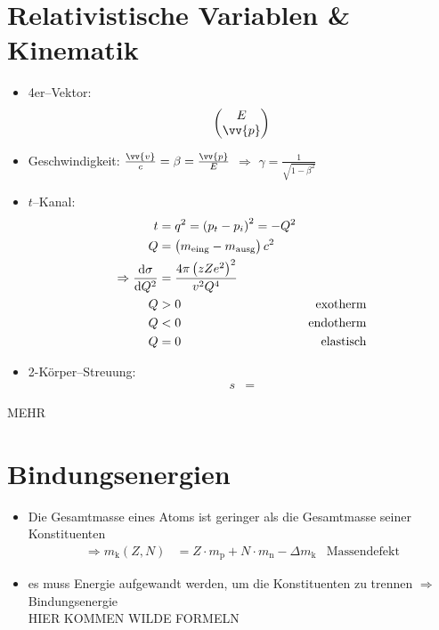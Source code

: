 \documentclass[BCOR=5mm,DIV=calc,listof=totoc,headings=big]{scrartcl}
\newcommand{\abl}[2]{\frac{\mathrm{d} #1}{\mathrm{d} #2}}
\begin{document}
\section{Relativistische Variablen \& Kinematik}
\label{sec:relat-vari-}
\begin{itemize}
\item 4er--Vektor:
  \begin{align*}
    \begin{pmatrix}
      E \\ \vv{p}
    \end{pmatrix}
  \end{align*}
\item Geschwindigkeit: $\frac{\vv{v}}{c}=\beta=\frac{\vv{p}}{E}$
  $\Rightarrow$ $\gamma=\frac{1}{\sqrt{1-\beta^{2}}}$
\item $t$--Kanal:
  \begin{align*}
    t&=q^{2}=\del{p_{t}-p_{i}}^{2}=-Q^{2}\\
    Q&=\del{m_{\text{eing}}-m_{\text{ausg}}}c^{2}\\
    \Rightarrow \abl{\sigma}{Q^{2}}&=\frac{4\pi
      \del{zZe^{2}}^{2}}{v^{2}Q^{4}}\\
    Q&>0 & \text{exotherm}\\
    Q&<0 & \text{endotherm}\\
    Q&=0 & \text{elastisch}
  \end{align*}
\item 2-Körper--Streuung:
  \begin{align*}
    s&=
  \end{align*}
\end{itemize}
MEHR

\section{Bindungsenergien}
\label{sec:bindungsenergien}
\begin{itemize}
\item Die Gesamtmasse eines Atoms ist geringer als die Gesamtmasse
  seiner Konstituenten
  \begin{align*}
    \Rightarrow m_{\mathrm{k}}(Z,N)&=Z \cdot m_{\mathrm{p}} + N \cdot
    m_{\mathrm{n}} - \Delta m_{\mathrm{k}} & \text{Massendefekt}
  \end{align*}
\item es muss Energie aufgewandt werden, um die Konstituenten zu
  trennen $\Rightarrow$ Bindungsenergie\\
HIER KOMMEN WILDE FORMELN
\end{itemize}
\end{document}
